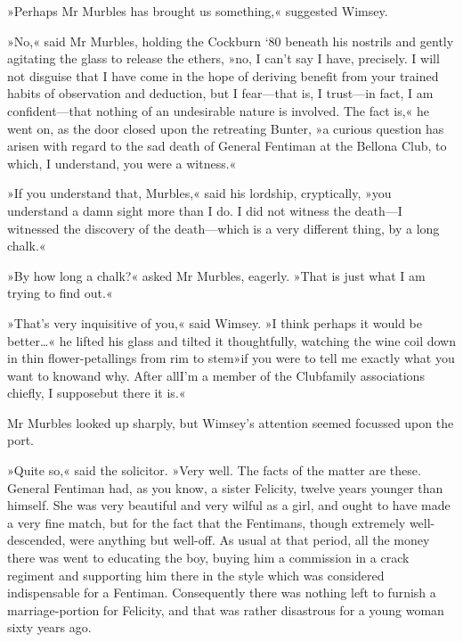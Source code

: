 »Perhaps Mr Murbles has brought us something,« suggested Wimsey.

»No,« said Mr Murbles, holding the Cockburn `80 beneath his nostrils and gently agitating the glass to release the ethers, »no, I can't say I have, precisely. I will not disguise that I have come in the hope of deriving benefit from your trained habits of observation and deduction, but I fear—that is, I trust—in fact, I am confident—that nothing of an undesirable nature is involved. The fact is,« he went on, as the door closed upon the retreating Bunter, »a curious question has arisen with regard to the sad death of General Fentiman at the Bellona Club, to which, I understand, you were a witness.«

»If you understand that, Murbles,« said his lordship, cryptically, »you understand a damn sight more than I do. I did not witness the death—I witnessed the discovery of the death—which is a very different thing, by a long chalk.«

»By how long a chalk?« asked Mr Murbles, eagerly. »That is just what I am trying to find out.«

»That's very inquisitive of you,« said Wimsey. »I think perhaps it would be better\dots« he lifted his glass and tilted it thoughtfully, watching the wine coil down in thin flower-petallings from rim to stem\textellipsis  »if you were to tell me exactly what you want to know\textellipsis  and why. After all\textellipsis  I'm a member of the Club\textellipsis  family associations chiefly, I suppose\textellipsis  but there it is.«

Mr Murbles looked up sharply, but Wimsey's attention seemed focussed upon the port.

»Quite so,« said the solicitor. »Very well. The facts of the matter are these. General Fentiman had, as you know, a sister Felicity, twelve years younger than himself. She was very beautiful and very wilful as a girl, and ought to have made a very fine match, but for the fact that the Fentimans, though extremely well-descended, were anything but well-off. As usual at that period, all the money there was went to educating the boy, buying him a commission in a crack regiment and supporting him there in the style which was considered indispensable for a Fentiman. Consequently there was nothing left to furnish a marriage-portion for Felicity, and that was rather disastrous for a young woman sixty years ago.

